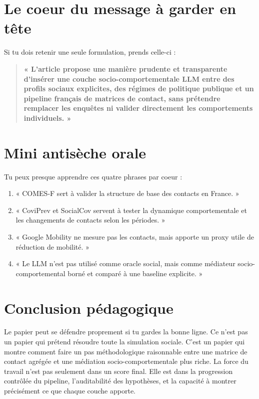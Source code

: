 \documentclass[11pt,a4paper]{article}
\begin{document}
\section{Le coeur du message à garder en tête}

Si tu dois retenir une seule formulation, prends celle-ci :

\begin{quote}
\textbf{« L'article propose une manière prudente et transparente d'insérer une couche socio-comportementale LLM entre des profils sociaux explicites, des régimes de politique publique et un pipeline français de matrices de contact, sans prétendre remplacer les enquêtes ni valider directement les comportements individuels. »}
\end{quote}

\section{Mini antisèche orale}

Tu peux presque apprendre ces quatre phrases par coeur :

\begin{enumerate}
\item « COMES-F sert à valider la structure de base des contacts en France. »
\item « CoviPrev et SocialCov servent à tester la dynamique comportementale et les changements de contacts selon les périodes. »
\item « Google Mobility ne mesure pas les contacts, mais apporte un proxy utile de réduction de mobilité. »
\item « Le LLM n'est pas utilisé comme oracle social, mais comme médiateur socio-comportemental borné et comparé à une baseline explicite. »
\end{enumerate}

\section{Conclusion pédagogique}

Le papier peut se défendre proprement si tu gardes la bonne ligne. Ce n'est pas un papier qui prétend résoudre toute la simulation sociale. C'est un papier qui montre comment faire un pas méthodologique raisonnable entre une matrice de contact agrégée et une médiation socio-comportementale plus riche. La force du travail n'est pas seulement dans un score final. Elle est dans la progression contrôlée du pipeline, l'auditabilité des hypothèses, et la capacité à montrer précisément ce que chaque couche apporte.
\end{document}
